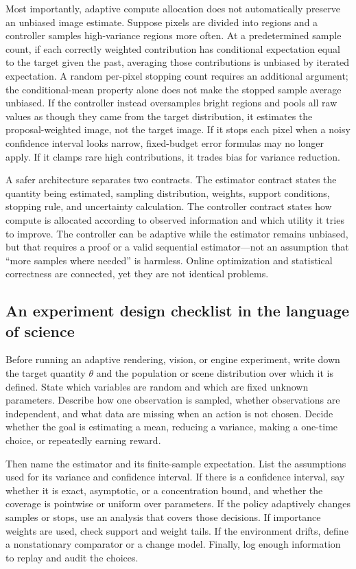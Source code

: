 Most importantly, adaptive compute allocation does not automatically preserve an unbiased image estimate. Suppose pixels are divided into regions and a controller samples high-variance regions more often. At a predetermined sample count, if each correctly weighted contribution has conditional expectation equal to the target given the past, averaging those contributions is unbiased by iterated expectation. A random per-pixel stopping count requires an additional argument; the conditional-mean property alone does not make the stopped sample average unbiased. If the controller instead oversamples bright regions and pools all raw values as though they came from the target distribution, it estimates the proposal-weighted image, not the target image. If it stops each pixel when a noisy confidence interval looks narrow, fixed-budget error formulas may no longer apply. If it clamps rare high contributions, it trades bias for variance reduction.

A safer architecture separates two contracts. The estimator contract states the quantity being estimated, sampling distribution, weights, support conditions, stopping rule, and uncertainty calculation. The controller contract states how compute is allocated according to observed information and which utility it tries to improve. The controller can be adaptive while the estimator remains unbiased, but that requires a proof or a valid sequential estimator---not an assumption that ``more samples where needed'' is harmless. Online optimization and statistical correctness are connected, yet they are not identical problems.

\subsection{An experiment design checklist in the language of science}\label{03-visual-computing-i-ch012-an-experiment-design-checklist-in-the-language-of-science}

Before running an adaptive rendering, vision, or engine experiment, write down the target quantity \(\theta\) and the population or scene distribution over which it is defined. State which variables are random and which are fixed unknown parameters. Describe how one observation is sampled, whether observations are independent, and what data are missing when an action is not chosen. Decide whether the goal is estimating a mean, reducing a variance, making a one-time choice, or repeatedly earning reward.

Then name the estimator and its finite-sample expectation. List the assumptions used for its variance and confidence interval. If there is a confidence interval, say whether it is exact, asymptotic, or a concentration bound, and whether the coverage is pointwise or uniform over parameters. If the policy adaptively changes samples or stops, use an analysis that covers those decisions. If importance weights are used, check support and weight tails. If the environment drifts, define a nonstationary comparator or a change model. Finally, log enough information to replay and audit the choices.

